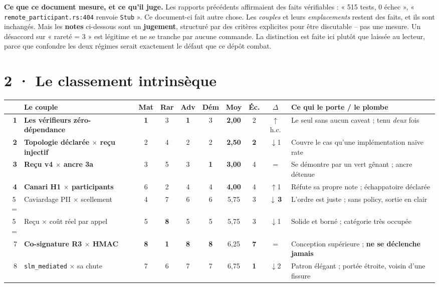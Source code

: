 \documentclass[10pt]{article}
\newcommand{\best}[1]{{\color{green}\textbf{#1}}}
\newcommand{\pire}[1]{{\color{red}\textbf{#1}}}
\newcommand{\sz}[1]{{\small\color{grey}\textsf{#1}}}
\newcommand{\code}[1]{\texttt{\small #1}}
\newcommand{\x}{$\times$}
\newcommand{\hausse}{{\color{green}$\uparrow$}}
\newcommand{\baisse}{{\color{red}$\downarrow$}}
\begin{document}
\begin{alerte}
\textbf{Ce que ce document mesure, et ce qu'il juge.} Les rapports précédents affirmaient des faits
vérifiables : « 515 tests, 0 échec », « \code{remote\_participant.rs:404} renvoie \code{Stub} ». Ce
document-ci fait autre chose. Les \emph{couples} et leurs \emph{emplacements} restent des faits, et ils
sont inchangés. Mais les \textbf{notes} ci-dessous sont un \textbf{jugement}, structuré par des
critères explicites pour être discutable -- pas une mesure. Un désaccord sur « rareté = 3 » est
légitime et ne se tranche par aucune commande. La distinction est faite ici plutôt que laissée au
lecteur, parce que confondre les deux régimes serait exactement le défaut que ce dépôt combat.
\end{alerte}

\section{2 · Le classement intrinsèque}

\renewcommand{\arraystretch}{1.2}
\begin{center}\small
\begin{tabular}{@{}r >{\raggedright\arraybackslash}p{5.1cm} cccc c c c >{\raggedright\arraybackslash}p{4.4cm}@{}}
\toprule
& \textbf{Le couple} & \sz{Mat} & \sz{Rar} & \sz{Adv} & \sz{Dém} & \textbf{Moy} & \sz{Éc.} & \sz{$\Delta$} & \textbf{Ce qui le porte / le plombe} \\
\midrule
\textbf{1} & \textbf{Les vérifieurs zéro-dépendance} & \best{1} & 3 & \best{1} & 3 & \textbf{2,00} & 2 & \hausse\sz{h.c.} &
  Le seul sans aucun caveat ; tenu \emph{deux} fois \\
\textbf{2} & \textbf{Topologie déclarée \x{} reçu injectif} & 2 & 4 & 2 & 2 & \textbf{2,50} & \best{2} & \baisse\sz{1} &
  Couvre le cas qu'une implémentation naïve rate \\
\textbf{3} & \textbf{Reçu v4 \x{} ancre 3a} & 3 & 5 & 3 & \best{1} & \textbf{3,00} & 4 & \sz{=} &
  Se démontre par un vert gênant ; ancre détenue \\
\textbf{4} & \textbf{Canari H1 \x{} participants} & 6 & 2 & 4 & 4 & \textbf{4,00} & 4 & \hausse\sz{1} &
  Réfute sa propre note ; échappatoire déclarée \\
5\,= & Caviardage PII \x{} scellement & 4 & 7 & 6 & 6 & 5,75 & 3 & \pire{\baisse\,3} &
  L'ordre est juste ; sans policy, sortie en clair \\
5\,= & Reçu \x{} coût réel par appel & 5 & \pire{8} & 5 & 5 & 5,75 & 3 & \baisse\sz{1} &
  Solide et borné ; catégorie très occupée \\
7 & \textbf{Co-signature R3 \x{} HMAC} & \pire{8} & \best{1} & \pire{8} & \pire{8} & 6,25 & \pire{7} & \sz{=} &
  Conception supérieure ; \textbf{ne se déclenche jamais} \\
8 & \code{slm\_mediated} \x{} sa chute & 7 & 6 & 7 & 7 & 6,75 & \best{1} & \baisse\sz{2} &
  Patron élégant ; portée étroite, voisin d'une fissure \\
\bottomrule
\end{tabular}
\end{center}
\end{document}

